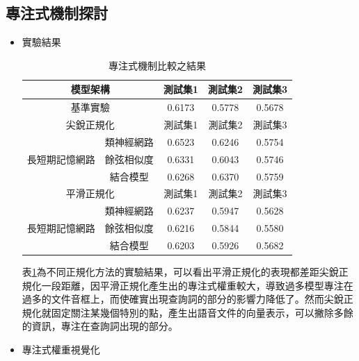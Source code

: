 \subsection{專注式機制探討}
\begin{itemize}
\item{實驗結果}

\begin{table}[ht]
	 \centering
	 \caption{專注式機制比較之結果}
	 \label{table:ch4_att}
	 \begin{tabular}{|c|c|c|c|c|}
		 \hline
		 \multicolumn{2}{|c|}{模型架構} & 測試集1 & 測試集2 & 測試集3 \\
		 \hline
		 \multicolumn{2}{|c|}{基準實驗} & 0.6173 & 0.5778 & 0.5678\\
		 \hline
		 \hline 
		 \multicolumn{2}{|c|}{尖銳正規化} & 測試集1 &測試集2 & 測試集3 \\
		 \hline
		 \multirow{3}{*}{長短期記憶網路} & 類神經網路 &
		 {\color{red}0.6523} &0.6246 & 0.5754 \\
		 \cline{2-5}
		 & 餘弦相似度& 0.6331 & 0.6043 & 0.5746 \\
		 \cline{2-5}
		 & 結合模型 & 0.6268 & 0.6370 & 0.5759 \\ 
		 \hline
		 \hline
		 \multicolumn{2}{|c|}{平滑正規化} & 測試集1 &測試集2
		 &測試集3 \\
		 \hline
		 \multirow{3}{*}{長短期記憶網路} & 類神經網路 &
		 0.6237 & 0.5947 & 0.5628\\
		 \cline{2-5}
		 & 餘弦相似度& 0.6216 &0.5844 & 0.5580 \\
		 \cline{2-5}
		 & 結合模型 &0.6203&0.5926&0.5682 \\
		 \hline
	   \end{tabular}
\end{table}
表\ref{table:ch4_att}為不同正規化方法的實驗結果，可以看出平滑正規化的表現都差距尖銳正規化一段距離，因平滑正規化產生出的專注式權重較大，導致過多模型專注在過多的文件音框上，而使確實出現查詢詞的部分的影響力降低了。然而尖銳正規化就固定關注某幾個特別的點，產生出語音文件的向量表示，可以撇除多餘的資訊，專注在查詢詞出現的部分。
\item{專注式權重視覺化}


\end{itemize}
